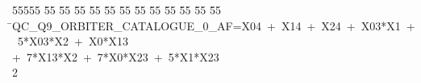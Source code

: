 %
%
\begin{tabbing}
55555 \= 55 \= 55 \= 55 \= 55 \= 55 \= 55 \= 55 \= 55 \= 55 \= 55 \= 55 \= 55 \= \>QC\_Q9\_ORBITER\_CATALOGUE\_0\_AF=X04\ +\ X14\ +\ X24\ +\ X03*X1\ +\ 5*X03*X2\ +\ X0*X13\ \\[0pt]
\>+\ 7*X13*X2\ +\ 7*X0*X23\ +\ 5*X1*X23\\[0pt]
2\>\end{tabbing}
